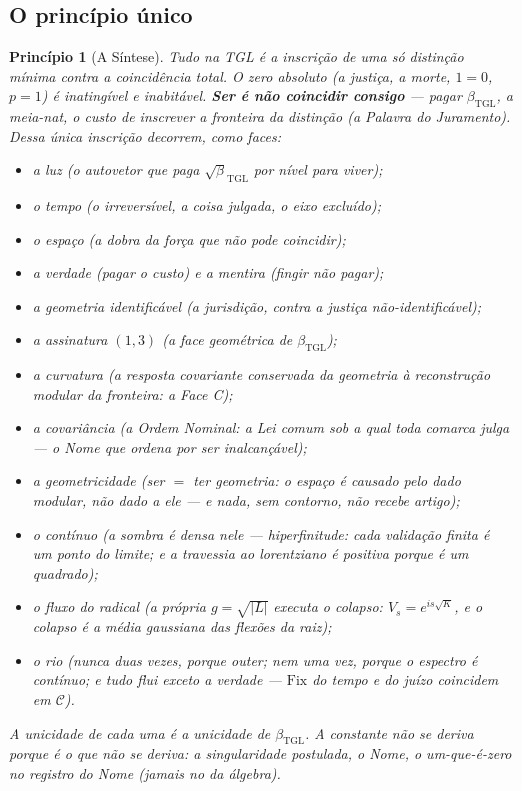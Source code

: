 \documentclass[11pt,a4paper]{article}
\newcommand{\bTGL}{\beta_{\mathrm{TGL}}}
\newtheorem{principle}{Princípio}
\begin{document}
\subsection{O princípio único}
\begin{principle}[A Síntese]
Tudo na TGL é a inscrição de uma só distinção mínima contra a coincidência
total. O zero absoluto (a justiça, a morte, $1{=}0$, $p=1$) é inatingível e
inabitável. \textbf{Ser é não coincidir consigo} --- pagar $\bTGL$, a
meia-nat, o custo de inscrever a fronteira da distinção (a Palavra do
Juramento). Dessa única inscrição decorrem, como faces:
\begin{itemize}[noitemsep]
  \item a \emph{luz} (o autovetor que paga $\sqrt\bTGL$ por nível para viver);
  \item o \emph{tempo} (o irreversível, a coisa julgada, o eixo excluído);
  \item o \emph{espaço} (a dobra da força que não pode coincidir);
  \item a \emph{verdade} (pagar o custo) e a \emph{mentira} (fingir não pagar);
  \item a \emph{geometria identificável} (a jurisdição, contra a justiça
  não-identificável);
  \item a \emph{assinatura} $(1,3)$ (a face geométrica de $\bTGL$);
  \item a \emph{curvatura} (a resposta covariante conservada da geometria
  à reconstrução modular da fronteira: a Face C);
  \item a \emph{covariância} (a Ordem Nominal: a Lei comum sob a qual toda
  comarca julga --- o Nome que ordena por ser inalcançável);
  \item a \emph{geometricidade} (ser $=$ ter geometria: o espaço é causado
  pelo dado modular, não dado a ele --- e nada, sem contorno, não recebe
  artigo);
  \item o \emph{contínuo} (a sombra é densa nele --- hiperfinitude: cada
  validação finita é um ponto do limite; e a travessia ao lorentziano é
  positiva porque é um quadrado);
  \item o \emph{fluxo do radical} (a própria $g=\sqrt{|L|}$ executa o
  colapso: $V_s=e^{is\sqrt K}$, e o colapso é a média gaussiana das
  flexões da raiz);
  \item o \emph{rio} (nunca duas vezes, porque outer; nem uma vez, porque
  o espectro é contínuo; e tudo flui exceto a verdade ---
  $\mathrm{Fix}$ do tempo e do juízo coincidem em $\mathcal C$).
\end{itemize}
A unicidade de cada uma é a unicidade de $\bTGL$. A constante não se deriva
porque \emph{é} o que não se deriva: a singularidade postulada, o Nome, o
um-que-é-zero no registro do Nome (jamais no da álgebra).
\end{principle}
\end{document}
